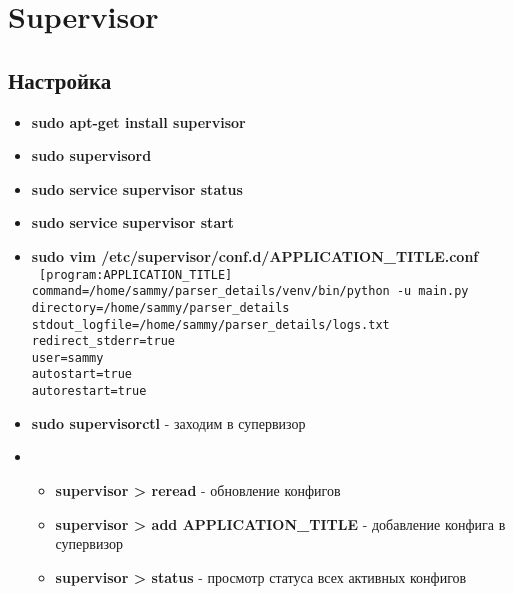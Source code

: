 \documentclass[14pt,a4paper,oneside]{extarticle}
\begin{document}
    \newpage
    \section{Supervisor}

        \subsection{Настройка}
            \begin{itemize}
                \item \textbf{sudo apt-get install supervisor}
                \item \textbf{sudo supervisord}
                \item \textbf{sudo service supervisor status}
                \item \textbf{sudo service supervisor start}
                \item \textbf{sudo vim /etc/supervisor/conf.d/APPLICATION\_TITLE.conf}\\

                \texttt{
                    [program:APPLICATION\_TITLE]\\
                    command=/home/sammy/parser\_details/venv/bin/python -u main.py\\
                    directory=/home/sammy/parser\_details\\
                    stdout\_logfile=/home/sammy/parser\_details/logs.txt\\
                    redirect\_stderr=true\\
                    user=sammy\\
                    autostart=true\\
                    autorestart=true\\
                }

                \item \textbf{sudo supervisorctl} - заходим в супервизор
                \item 
                    \begin{itemize}
                        \item \textbf{supervisor > reread} - обновление конфигов
                        \item \textbf{supervisor > add APPLICATION\_TITLE} - добавление конфига в супервизор
                        \item \textbf{supervisor > status} - просмотр статуса всех активных конфигов
                    \end{itemize} 
            \end{itemize}
\end{document}
